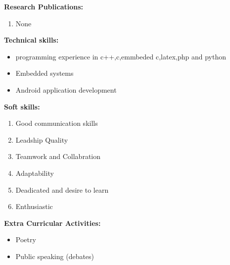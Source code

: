 \documentclass[10pt,a4paper]{article}
\begin{document}
\begin{flushleft}
	\textbf{Research Publications:}
	\begin{enumerate}
		\item None\\ \medskip
	\end{enumerate} 
	\textbf{Technical skills:}\\
	\begin{itemize}
		\item programming experience in c++,c,emmbeded c,latex,php and python\\
		\item  Embedded systems\\
		\item  Android application development\\
	\end{itemize}
	\textbf{Soft skills:}\\
	\begin{enumerate}
		\item Good communication skills\\
		\item Leadship Quality\\
		\item Teamwork and Collabration\\
		\item Adaptability\\
		\item Deadicated and desire to learn\\
		\item Enthusiastic\\
		
	\end{enumerate}
	\textbf{Extra Curricular Activities:}\\
	
	\begin{itemize}
		\item Poetry\\
		\item Public speaking (debates)\\
		
	\end{itemize}
	
\end{flushleft}

 
\end{document}
